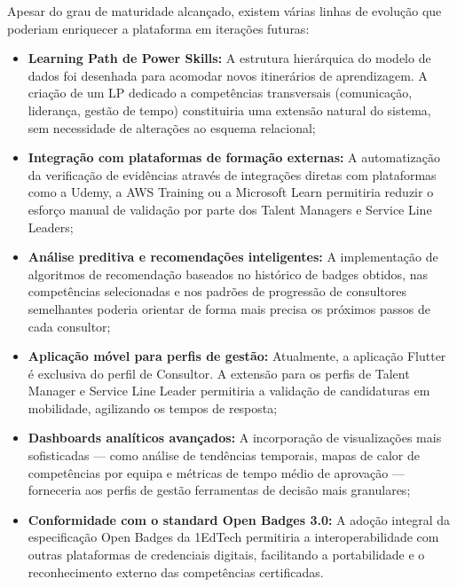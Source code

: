 \documentclass[12pt,a4paper]{report}
\begin{document}
Apesar do grau de maturidade alcançado, existem várias linhas de evolução que poderiam enriquecer a plataforma em iterações futuras:

\begin{itemize}
  \item \textbf{Learning Path de Power Skills:} A estrutura hierárquica do modelo de dados foi desenhada para acomodar novos itinerários de aprendizagem. A criação de um LP dedicado a competências transversais (comunicação, liderança, gestão de tempo) constituiria uma extensão natural do sistema, sem necessidade de alterações ao esquema relacional;
  \item \textbf{Integração com plataformas de formação externas:} A automatização da verificação de evidências através de integrações diretas com plataformas como a Udemy, a AWS Training ou a Microsoft Learn permitiria reduzir o esforço manual de validação por parte dos Talent Managers e Service Line Leaders;
  \item \textbf{Análise preditiva e recomendações inteligentes:} A implementação de algoritmos de recomendação baseados no histórico de badges obtidos, nas competências selecionadas e nos padrões de progressão de consultores semelhantes poderia orientar de forma mais precisa os próximos passos de cada consultor;
  \item \textbf{Aplicação móvel para perfis de gestão:} Atualmente, a aplicação Flutter é exclusiva do perfil de Consultor. A extensão para os perfis de Talent Manager e Service Line Leader permitiria a validação de candidaturas em mobilidade, agilizando os tempos de resposta;
  \item \textbf{Dashboards analíticos avançados:} A incorporação de visualizações mais sofisticadas --- como análise de tendências temporais, mapas de calor de competências por equipa e métricas de tempo médio de aprovação --- forneceria aos perfis de gestão ferramentas de decisão mais granulares;
  \item \textbf{Conformidade com o standard Open Badges 3.0:} A adoção integral da especificação Open Badges da 1EdTech permitiria a interoperabilidade com outras plataformas de credenciais digitais, facilitando a portabilidade e o reconhecimento externo das competências certificadas.
\end{itemize}

\printbibliography[heading=bibintoc,title={Referências Bibliográficas}]

\end{document}
